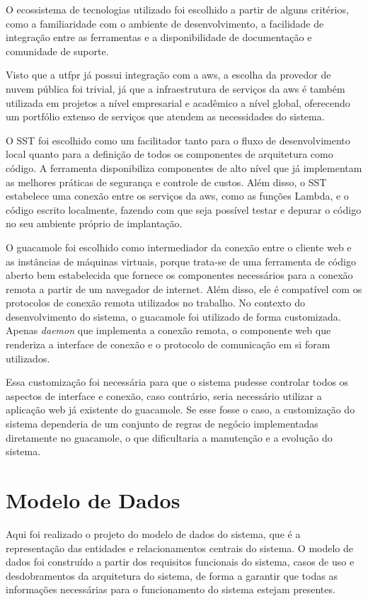 O ecossistema de tecnologias utilizado foi escolhido a partir de alguns critérios, como a familiaridade com o ambiente de desenvolvimento, a facilidade de integração entre as ferramentas e a disponibilidade de documentação e comunidade de suporte.

Visto que a \gls{utfpr} já possui integração com a \gls{aws}, a escolha da provedor de nuvem pública foi trivial, já que a infraestrutura de serviços da \gls{aws} é também utilizada em projetos a nível empresarial e acadêmico a nível global, oferecendo um portfólio extenso de serviços que atendem as necessidades do sistema.

O SST foi escolhido como um facilitador tanto para o fluxo de desenvolvimento local quanto para a definição de todos os componentes de arquitetura como código. A ferramenta disponibiliza componentes de alto nível que já implementam as melhores práticas de segurança e controle de custos. Além disso, o SST estabelece uma conexão entre os serviços da \gls{aws}, como as funções Lambda, e o código escrito localmente, fazendo com que seja possível testar e depurar o código no seu ambiente próprio de implantação.

O \gls{guacamole} foi escolhido como intermediador da conexão entre o cliente web e as instâncias de máquinas virtuais, porque trata-se de uma ferramenta de código aberto bem estabelecida que fornece os componentes necessários para a conexão remota a partir de um navegador de internet. Além disso, ele é compatível com os protocolos de conexão remota utilizados no trabalho. No contexto do desenvolvimento do sistema, o \gls{guacamole} foi utilizado de forma customizada. Apenas \textit{daemon} que implementa a conexão remota, o componente web que renderiza a interface de conexão e o protocolo de comunicação em si foram utilizados.

Essa customização foi necessária para que o sistema pudesse controlar todos os aspectos de interface e conexão, caso contrário, seria necessário utilizar a aplicação web já existente do \gls{guacamole}. Se esse fosse o caso, a customização do sistema dependeria de um conjunto de regras de negócio implementadas diretamente no \gls{guacamole}, o que dificultaria a manutenção e a evolução do sistema.

\section{Modelo de Dados}
\label{sec:modeloDeDados}

Aqui foi realizado o projeto do modelo de dados do sistema, que é a representação das entidades e relacionamentos centrais do sistema. O modelo de dados foi construído a partir dos requisitos funcionais do sistema, casos de uso e desdobramentos da arquitetura do sistema, de forma a garantir que todas as informações necessárias para o funcionamento do sistema estejam presentes. 

